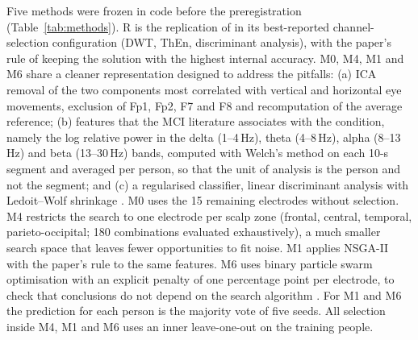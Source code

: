 Five methods were frozen in code before the preregistration (Table~\ref{tab:methods}). R is the replication of \citet{aljalal2024} in its best-reported channel-selection configuration (DWT, ThEn, discriminant analysis), with the paper's rule of keeping the solution with the highest internal accuracy. M0, M4, M1 and M6 share a cleaner representation designed to address the pitfalls: (a) ICA removal of the two components most correlated with vertical and horizontal eye movements, exclusion of Fp1, Fp2, F7 and F8 and recomputation of the average reference; (b) features that the MCI literature associates with the condition, namely the log relative power in the delta (1--4\,Hz), theta (4--8\,Hz), alpha (8--13\,Hz) and beta (13--30\,Hz) bands, computed with Welch's method \citep{welch1967} on each 10-s segment and averaged per person, so that the unit of analysis is the person and not the segment; and (c) a regularised classifier, linear discriminant analysis with Ledoit--Wolf shrinkage \citep{ledoit2004}. M0 uses the 15 remaining electrodes without selection. M4 restricts the search to one electrode per scalp zone (frontal, central, temporal, parieto-occipital; 180 combinations evaluated exhaustively), a much smaller search space that leaves fewer opportunities to fit noise. M1 applies NSGA-II with the paper's rule to the same features. M6 uses binary particle swarm optimisation \citep{kennedy1997} with an explicit penalty of one percentage point per electrode, to check that conclusions do not depend on the search algorithm \citep{wolpert1997}. For M1 and M6 the prediction for each person is the majority vote of five seeds. All selection inside M4, M1 and M6 uses an inner leave-one-out on the training people.

